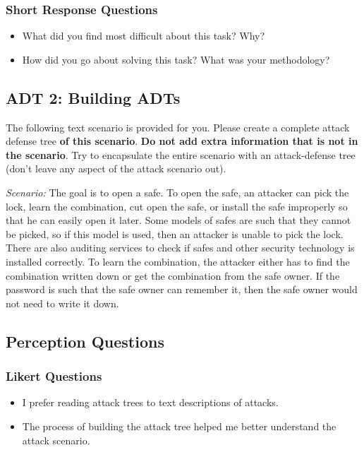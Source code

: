\subsubsection{Short Response Questions}
\begin{itemize}
  \setlength{\itemindent}{\qIndent}
  \item[\surveyq{LS-ADT1-W1}] What did you find most difficult about this task? Why?
  \item[\surveyq{LS-ADT1-W2}] How did you go about solving this task? What was your methodology?
\end{itemize}



\subsection{ADT 2: Building ADTs}

The following text scenario is provided for you. Please create a complete attack defense tree \textbf{of this scenario}. \textbf{Do not add extra information that is not in the scenario}. Try to encapsulate the entire scenario with an attack-defense tree (don't leave any aspect of the attack scenario out).

\emph{Scenario:} 
The goal is to open a safe. To open the safe, an attacker can pick the lock,
learn the combination, cut open the safe, or install the safe improperly so
that he can easily open it later. Some models of safes are such that they cannot be picked, so if this model is used, then an attacker is unable to pick the lock. There are also auditing services to check if safes and other security technology is installed correctly. To learn the combination, the attacker
either has to find the combination written down or get the combination
from the safe owner. If the password is such that the safe owner can remember it, then the safe owner would not need to write it down.



\subsection*{Perception Questions}

\subsubsection{Likert Questions}
\begin{itemize}
  \setlength{\itemindent}{\qIndent}
  \item[\surveyq{LS-ADT2-L1}] I prefer reading attack trees to text descriptions of attacks.
  \item[\surveyq{LS-ADT2-L2}] The process of building the attack tree helped me better understand the attack scenario.
\end{itemize}

